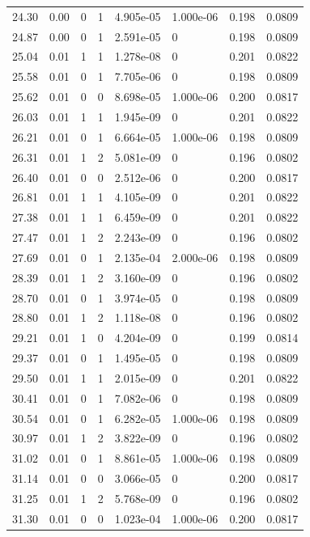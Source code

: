 \documentclass[preview]{standalone}
\begin{document}
{{{\begin{tabular}{L{1.2cm}C{1.2cm} C{0.3cm}C{0.5cm} C{1.4cm}C{1.4cm} C{1.4cm}C{1.4cm}}
  24.30  &  0.00  & 0     &  1 &  4.905e-05  & 1.000e-06  & 0.198 &  0.0809   \\ 
  24.87  &  0.00  & 0     &  1 &  2.591e-05  & 0  & 0.198 &  0.0809   \\ 
  25.04  &  0.01  & 1     &  1 &  1.278e-08  & 0  & 0.201 &  0.0822   \\ 
  25.58  &  0.01  & 0     &  1 &  7.705e-06  & 0  & 0.198 &  0.0809   \\ 
  25.62  &  0.01  & 0     &  0 &  8.698e-05  & 1.000e-06  & 0.200 &  0.0817   \\ 
  26.03  &  0.01  & 1     &  1 &  1.945e-09  & 0  & 0.201 &  0.0822   \\ 
  26.21  &  0.01  & 0     &  1 &  6.664e-05  & 1.000e-06  & 0.198 &  0.0809   \\ 
  26.31  &  0.01  & 1     &  2 &  5.081e-09  & 0  & 0.196 &  0.0802   \\ 
  26.40  &  0.01  & 0     &  0 &  2.512e-06  & 0  & 0.200 &  0.0817   \\ 
  26.81  &  0.01  & 1     &  1 &  4.105e-09  & 0  & 0.201 &  0.0822   \\ 
  27.38  &  0.01  & 1     &  1 &  6.459e-09  & 0  & 0.201 &  0.0822   \\ 
  27.47  &  0.01  & 1     &  2 &  2.243e-09  & 0  & 0.196 &  0.0802   \\ 
  27.69  &  0.01  & 0     &  1 &  2.135e-04  & 2.000e-06  & 0.198 &  0.0809   \\ 
  28.39  &  0.01  & 1     &  2 &  3.160e-09  & 0  & 0.196 &  0.0802   \\ 
  28.70  &  0.01  & 0     &  1 &  3.974e-05  & 0  & 0.198 &  0.0809   \\ 
  28.80  &  0.01  & 1     &  2 &  1.118e-08  & 0  & 0.196 &  0.0802   \\ 
  29.21  &  0.01  & 1     &  0 &  4.204e-09  & 0  & 0.199 &  0.0814   \\ 
  29.37  &  0.01  & 0     &  1 &  1.495e-05  & 0  & 0.198 &  0.0809   \\ 
  29.50  &  0.01  & 1     &  1 &  2.015e-09  & 0  & 0.201 &  0.0822   \\ 
  30.41  &  0.01  & 0     &  1 &  7.082e-06  & 0  & 0.198 &  0.0809   \\ 
  30.54  &  0.01  & 0     &  1 &  6.282e-05  & 1.000e-06  & 0.198 &  0.0809   \\ 
  30.97  &  0.01  & 1     &  2 &  3.822e-09  & 0  & 0.196 &  0.0802   \\ 
  31.02  &  0.01  & 0     &  1 &  8.861e-05  & 1.000e-06  & 0.198 &  0.0809   \\ 
  31.14  &  0.01  & 0     &  0 &  3.066e-05  & 0  & 0.200 &  0.0817   \\ 
  31.25  &  0.01  & 1     &  2 &  5.768e-09  & 0  & 0.196 &  0.0802   \\ 
  31.30  &  0.01  & 0     &  0 &  1.023e-04  & 1.000e-06  & 0.200 &  0.0817   \\ 
\hline 
\end{tabular} 

}}}
\end{document}

